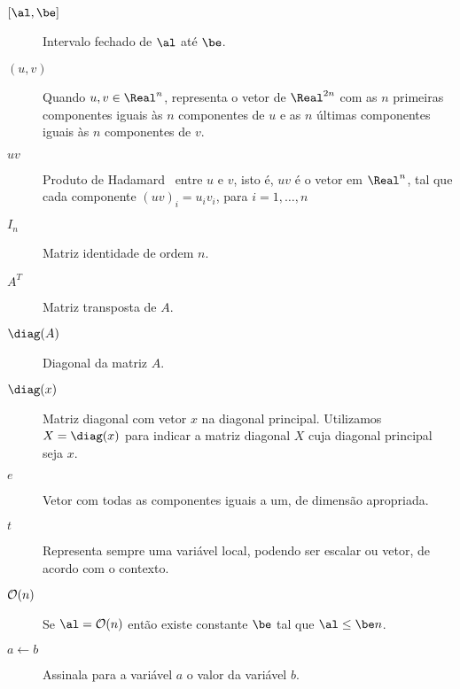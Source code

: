 \begin{description}
    \item[{$[\al, \be]$}] Intervalo fechado de $\al$ até $\be$.

    \item[$(u,v)$] Quando $u, v\in\Real^n$, representa o vetor de $\Real^{2n}$ com as $n$ primeiras componentes iguais às $n$ componentes de  $u$ e  as $n$ últimas componentes iguais às $n$ componentes de $v$.

    \item[$uv$]  Produto de Hadamard~\cite[p.~455]{Horn:1985tf} entre $u$ e $v$, 
isto é, $uv$ é o vetor em $\Real^n$, tal que cada componente  $(uv)_i  = u_iv_i$, para $i=1,\ldots,n$

\item[$I_{n}$] Matriz identidade de ordem $n$.

    \item[$A^T$] Matriz transposta de $A$.

    \item[$\diag(A)$] Diagonal da matriz $A$. 

    \item[$\diag(x)$] Matriz diagonal com vetor $x$ na diagonal principal. Utilizamos $X = \diag(x)$ para indicar a matriz diagonal $X$ cuja diagonal principal seja $x$.
 
    \item[$e$] Vetor com todas as componentes iguais a um, de dimensão apropriada.

    \item[$t$] Representa sempre uma variável local, podendo ser escalar ou vetor, de acordo com o contexto.


    \item[$\mathcal{O}(n)$] Se $\al = \Oset(n)$ então existe constante $\be$ tal que $\al \leq \be n$.

    \item[$a\leftarrow b$] Assinala para a variável $a$ o valor da variável $b$.

\end{description}
